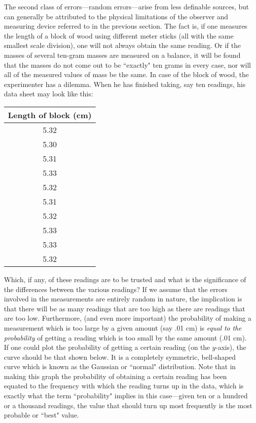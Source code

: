\documentclass[main.tex]{subfiles}
\begin{document}
The second class of errors---random errors---arise from less definable sources, but can generally be attributed to the physical limitations of the observer and measuring device referred to in the previous section.  The fact is, if one measures the length of a block of wood using different meter sticks (all with the same smallest scale division), one will not always obtain the same reading.  Or if the masses of several ten-gram masses are measured on a balance, it will be found that the masses do not come out to be ``exactly" ten grams in every case, nor will all of the measured values of mass be the same.  In case of the block of wood, the experimenter has a dilemma.  When he has finished taking, say ten readings, his data sheet may look like this:
\begin{table}[h]
\centering
\begin{tabular}{c}
Length of block (cm)\\
\hline
5.32\\
5.30\\
5.31\\
5.33\\
5.32\\
5.31\\
5.32\\
5.33\\
5.33\\
5.32
\end{tabular}
\end{table}
\FloatBarrier
Which, if any, of these readings are to be trusted and what is the significance of the differences between the various readings?  If we assume that the errors involved in the measurements are entirely random in nature, the implication is that there will be as many readings that are too high as there are readings that are too low. Furthermore, (and even more important) the probability of making a measurement which is too large by a given amount  (say .01 cm) is \emph{equal to the probability} of getting a reading which is too small by the same amount (.01 cm).  If one could plot the probability of getting a certain reading (on the $y$-axis),  the  curve  should  be  that  shown  below.  It  is a completely  symmetric, bell-shaped curve which is known as the Gaussian or ``normal" distribution.  Note that in making this graph the probability of obtaining a certain reading has been equated to the frequency with which the reading turns up in the data, which is exactly what the term ``probability" implies in this case---given ten or a hundred or a thousand readings, the value that should turn up most frequently is the most probable or ``best" value.
\end{document}

